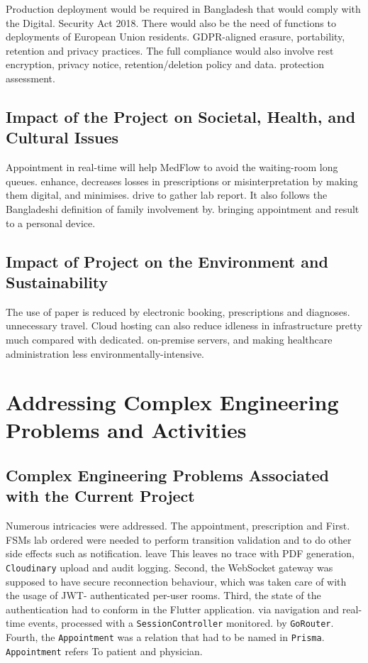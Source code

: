 \documentclass[12pt,a4paper]{report}
\begin{document}
Production deployment would be required in Bangladesh that would comply with the Digital.
Security Act 2018. There would also be the need of functions to deployments of European Union residents.
GDPR-aligned erasure, portability, retention and privacy practices. The full compliance would also involve rest encryption, privacy notice, retention/deletion policy and data.
protection assessment.

\section{Impact of the Project on Societal, Health, and Cultural Issues}

Appointment in real-time will help MedFlow to avoid the waiting-room long queues.
enhance, decreases losses in prescriptions or misinterpretation by making them digital, and minimises.
drive to gather lab report. It also follows the Bangladeshi definition of family involvement by.
bringing appointment and result to a personal device.

\section{Impact of Project on the Environment and Sustainability}

The use of paper is reduced by electronic booking, prescriptions and diagnoses.
unnecessary travel. Cloud hosting can also reduce idleness in infrastructure pretty much compared with dedicated.
on-premise servers, and making healthcare administration less environmentally-intensive.

\chapter{Addressing Complex Engineering Problems and Activities}
\label{chap:complex-engineering}

\section{Complex Engineering Problems Associated with the Current Project}

Numerous intricacies were addressed. The appointment, prescription and First.
FSMs lab ordered were needed to perform transition validation and to do other side effects such as notification.
leave This leaves no trace with PDF generation, \texttt{Cloudinary} upload and audit logging.
Second, the WebSocket gateway was supposed to have secure reconnection behaviour, which was taken care of with the usage of JWT-
authenticated per-user rooms. Third, the state of the authentication had to conform in the Flutter application.
via navigation and real-time events, processed with a \texttt{SessionController} monitored.
by \texttt{GoRouter}. Fourth, the \texttt{Appointment} was a relation that had to be named in \texttt{Prisma}.
\texttt{Appointment} refers To patient and physician.
\end{document}
